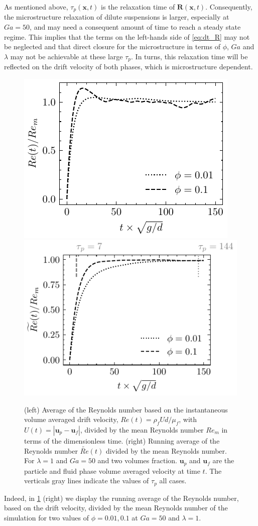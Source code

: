 As mentioned above, $\tau_p(\textbf{x},t)$ is the relaxation time of $\textbf{R}(\textbf{x},t)$. 
Consequently, the microstructure relaxation of dilute suspensions is larger, especially at $Ga = 50$, and may need a consequent amount of time to reach a steady state regime. 
This implies that the terms on the left-hands side of \ref{eq:dt_R} may not be neglected and that direct closure for the microstructure in terms of $\phi$, $Ga$ and $\lambda$ may not be achievable at these large $\tau_p$. 
In turns, this relaxation time will be reflected on the drift velocity of both phases, which is microstructure dependent. 
\begin{figure}
    \centering
    \includegraphics[height=0.325\textwidth]{image/HOMOGENEOUS_NEW/CA/Relax2.pdf}
    \includegraphics[height=0.35\textwidth]{image/HOMOGENEOUS_NEW/CA/Relax.pdf}
    \caption{
        (left) Average of the Reynolds number based on the instantaneous volume averaged drift velocity, $Re(t) = \rho_fU d /\mu_f$, with $U(t) = |\textbf{u}_p - \textbf{u}_f|$, divided by the mean Reynolds number $Re_m$ in terms of the dimensionless time. 
        (right) Running average of the Reynolds number $\widetilde{Re}(t)$ divided by the mean Reynolds number.
        For $\lambda = 1$ and $Ga = 50$ and two volumes fraction. 
        $\textbf{u}_p$ and $\textbf{u}_f$ are the particle and fluid phase volume averaged velocity at time $t$.
        The verticals gray lines indicate the values of $\tau_p$ all cases. 
        }
        \label{fig:relax}
\end{figure}
Indeed, in \ref{fig:relax} (right) we display the running average of the Reynolds number, based on the drift velocity, divided by the mean Reynolds number of the simulation for two values of $\phi = 0.01,0.1$ at $Ga = 50$ and $\lambda =1$. 
